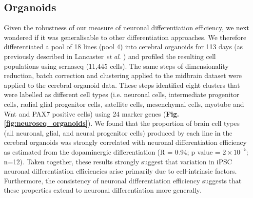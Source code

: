 \subsection{Organoids}
\label{sec:organoids}

Given the robustness of our measure of neuronal differentiation efficiency, we next wondered if it was generalisable to other differentiation approaches. 
We therefore differentiated a pool of 18 lines (pool 4) into cerebral organoids for 113 days (as previously described in Lancaster \textit{et al}. \cite{lancaster2017guided}) and profiled the resulting cell populations using \gls{scrnaseq} (11,445 cells). 
The same steps of dimensionality reduction, batch correction and clustering applied to the midbrain dataset were applied to the cerebral organoid data. 
These steps identified eight clusters that were labelled as different cell types (i.e. neuronal cells, intermediate progenitor cells, radial glial progenitor cells, satellite cells, mesenchymal cells, myotube and Wnt and PAX7 positive cells) using 24 marker genes (\textbf{Fig. \ref{fig:neuroseq_organoids}}).
We found that the proportion of brain cell types (all neuronal, glial, and neural progenitor cells) produced by each line in the cerebral organoids was strongly correlated with neuronal differentiation efficiency as estimated from the dopaminergic differentiation (R = 0.94; p value = $2 \times 10^{-5}$; n=12). 
Taken together, these results strongly suggest that variation in iPSC neuronal differentiation efficiencies arise primarily due to cell-intrinsic factors. 
Furthermore, the consistency of neuronal differentiation efficiency suggests that these properties extend to neuronal differentiation more generally.

